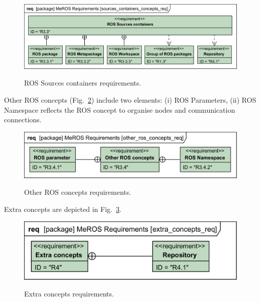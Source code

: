 \documentclass[11pt,oneside,a4paper]{report}
\begin{document}
	\begin{figure}[H]
		\centering
		\begin{center}
			{\includegraphics[scale=1.0]{diagrams/sources_containers_concepts_req.png}}
		\end{center}
		\caption{ROS Sources containers requirements.} 
		\label{fig:sources_containers_req}
	\end{figure}
	
	\pagebreak
	
	Other ROS concepts (Fig.~\ref{fig:other_ros_concepts_req}) include two elements: (i) ROS Parameters, (ii) ROS Namespace reflects the ROS concept to organise nodes and communication connections.
	
	\begin{figure}[H]
			\centering
			\begin{center}
					{\includegraphics[scale=1.0]{diagrams/other_ros_concepts_req.png}}
				\end{center}
			\caption{Other ROS concepts requirements.} 
			\label{fig:other_ros_concepts_req}
		\end{figure}

Extra concepts are depicted in Fig.~\ref{fig:extra_concepts_req}.

\begin{figure}[H]
	\centering
	\begin{center}
		{\includegraphics[scale=1.0]{diagrams/extra_concepts_req.png}}
	\end{center}
	\caption{Extra concepts requirements.} 
	\label{fig:extra_concepts_req}
\end{figure}
\end{document}
